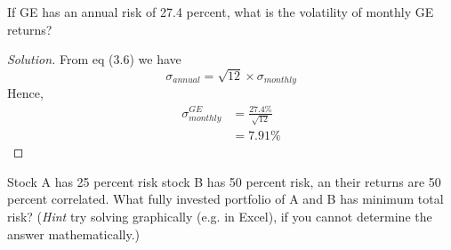 \begin{problem}{3.1}
  If GE has an annual risk of 27.4 percent, what is the volatility of monthly GE returns?
\end{problem}

\begin{proof}[Solution]
  From eq (3.6) we have
  \begin{equation*}
   \sigma_{annual}=\sqrt{12}\times\sigma_{monthly}
  \end{equation*}
  Hence,
  \begin{align*}
   \sigma_{monthly}^{GE}&=\frac{27.4\%}{\sqrt{12}} \\
			&=7.91\%
  \end{align*}
\end{proof}


\begin{problem}{3.2}
 Stock A has 25 percent risk stock B has 50 percent risk, an their returns are 50 percent correlated. What fully invested portfolio of A and B has minimum total risk? (\textit{Hint} try solving graphically (e.g. in Excel), if you cannot determine the answer mathematically.)
\end{problem}

